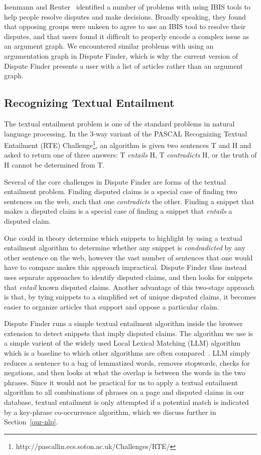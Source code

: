 \documentclass{www2010-submission}
\newcommand{\todo}[1]{}
\begin{document}
Isenmann and Reuter~\cite{Isenmann1997} identified a number of problems with using IBIS tools to help people resolve disputes and make decisions. Broadly speaking, they found that opposing groups were unkeen to agree to use an IBIS tool to resolve their disputes, and that users found it difficult to properly encode a complex issue as an argument graph. We encountered similar problems with using an argumentation graph in Dispute Finder, which is why the current version of Dispute Finder presents a user with a list of articles rather than an argument graph.


\subsection{Recognizing Textual Entailment}

\todo{Trim this down??}

The textual entailment problem is one of the standard problems in natural language processing. In the 3-way variant of the PASCAL Recognizing Textual Entailment (RTE) Challenge\footnote{http://pascallin.ecs.soton.ac.uk/Challenges/RTE/}, an algorithm is given two sentences T and H and asked to return one of three answers: T {\it entails} H, T {\it contradicts} H, or the truth of H cannot be determined from T. 

Several of the core challenges in Dispute Finder are forms of the textual entailment problem. Finding disputed claims is a special case of finding two sentences on the web, such that one {\it contradicts} the other. Finding a snippet that makes a disputed claim is a special case of finding a snippet that {\it entails} a disputed claim. 

One could in theory determine which snippets to highlight by using a textual entailment algorithm to determine whether any snippet is {\it condradicted} by any other sentence on the web, however the vast number of sentences that one would have to compare makes this approach impractical. Dispute Finder thus instead uses separate approaches to identify disputed claims, and then looks for snippets that {\it entail} known disputed claims. Another advantage of this two-stage approach is that, by tying snippets to a simplified set of unique disputed claims, it becomes easier to organize articles that support and oppose a particular claim.

Dispute Finder runs a simple textual entailment algorithm inside the browser extension to detect snippets that imply disputed claims. The algorithm we use is a simple varient of the widely used Local Lexical Matching (LLM) algorithm~\cite{Jijkoun2006} which is a baseline to which other algorithms are often compared~\cite{Braz}. LLM simply reduces a sentence to a bag of lemmatized words, removes stopwords, checks for negations, and then looks at what the overlap is between the words in the two phrases. Since it would not be practical for us to apply a textual entailment algorithm to all combinations of phrases on a page and disputed claims in our database, textual entailment is only attempted if a potential match is indicated by a key-phrase co-occurrence algorithm, which we discuss further in Section~\ref{our-nlp}.
\end{document}
